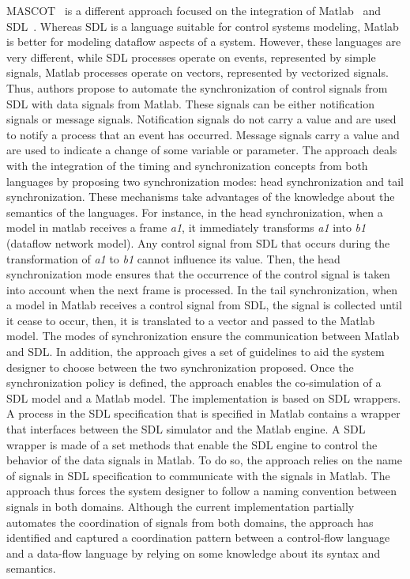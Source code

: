 MASCOT~\cite{mascotbib} is a different approach focused on the integration of Matlab~\cite{matlabbib} and SDL~\cite{sdlbib}. Whereas SDL is a language suitable for control systems modeling, Matlab is better for modeling dataflow aspects of a system. However, these languages are very different, while SDL processes operate on events, represented by simple signals, Matlab processes operate on vectors, represented by vectorized signals. Thus, authors propose to automate the synchronization of control signals from SDL with data signals from Matlab. These signals can be either notification signals or message signals. Notification signals do not carry a value and are used to notify a process that an event has occurred. Message signals carry a value and are used to indicate a change of some variable or parameter. The approach deals with the integration of the timing and synchronization concepts from both languages by proposing two synchronization modes: head synchronization and tail synchronization. These mechanisms take advantages of the knowledge about the semantics of the languages. For instance, in the head synchronization, when a model in matlab receives a frame \emph{a1}, it immediately transforms \emph{a1} into \emph{b1} (dataflow network model). Any control signal from SDL that occurs during the transformation of \emph{a1} to \emph{b1} cannot influence its value. Then, the head synchronization mode ensures that the occurrence of the control signal is taken into account when the next frame is processed. In the tail synchronization, when a model in Matlab receives a control signal from SDL, the signal is collected until it cease to occur, then, it is translated to a vector and passed to the Matlab model. The modes of synchronization ensure the communication between Matlab and SDL. In addition, the approach gives a set of guidelines to aid the system designer to choose between the two synchronization proposed. Once the synchronization policy is defined, the approach enables the co-simulation of a SDL model and a Matlab model. The implementation is based on SDL wrappers. A process in the SDL specification that is specified in Matlab contains a wrapper that interfaces between the SDL simulator and the Matlab engine. A SDL wrapper is made of a set methods that enable the SDL engine to control the behavior of the data signals in Matlab. To do so, the approach relies on the name of signals in SDL specification to communicate with the signals in Matlab. The approach thus forces the system designer to follow a naming convention between signals in both domains. Although the current implementation partially automates the coordination of signals from both domains, the approach has identified and captured a coordination pattern between a control-flow language and a data-flow language by relying on some knowledge about its syntax and semantics.

